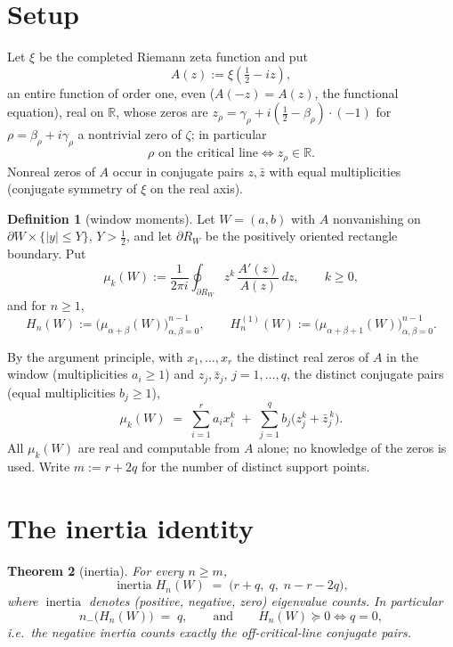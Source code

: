 \documentclass[11pt]{article}
\theoremstyle{plain}
\newtheorem{theorem}{Theorem}
\theoremstyle{definition}
\newtheorem{definition}[theorem]{Definition}
\theoremstyle{remark}
\newcommand{\R}{\mathbb{R}}
\DeclareMathOperator{\inertia}{inertia}
\begin{document}
\section{Setup}

Let $\xi$ be the completed Riemann zeta function and put
\[
  A(z) := \xi\!\left(\tfrac12 - iz\right),
\]
an entire function of order one, even ($A(-z)=A(z)$, the functional equation), real on
$\R$, whose zeros are $z_\rho = \gamma_\rho + i(\tfrac12-\beta_\rho)\cdot(-1)$ for
$\rho = \beta_\rho + i\gamma_\rho$ a nontrivial zero of $\zeta$; in particular
\[
  \rho \text{ on the critical line} \iff z_\rho \in \R .
\]
Nonreal zeros of $A$ occur in conjugate pairs $z,\bar z$ with equal multiplicities
(conjugate symmetry of $\xi$ on the real axis).

\begin{definition}[window moments]\label{def:moments}
Let $W=(a,b)$ with $A$ nonvanishing on $\partial W \times \{|y|\le Y\}$, $Y>\tfrac12$,
and let $\partial R_W$ be the positively oriented rectangle boundary. Put
\[
  \mu_k(W) := \frac{1}{2\pi i}\oint_{\partial R_W} z^k\,\frac{A'(z)}{A(z)}\,dz,
  \qquad k \ge 0,
\]
and for $n\ge 1$,
\[
  H_n(W) := \bigl(\mu_{\alpha+\beta}(W)\bigr)_{\alpha,\beta=0}^{n-1},
  \qquad
  H_n^{(1)}(W) := \bigl(\mu_{\alpha+\beta+1}(W)\bigr)_{\alpha,\beta=0}^{n-1}.
\]
\end{definition}

By the argument principle, with $x_1,\dots,x_r$ the distinct real zeros of $A$ in the
window (multiplicities $a_i\ge 1$) and $z_j,\bar z_j$, $j=1,\dots,q$, the distinct
conjugate pairs (equal multiplicities $b_j \ge 1$),
\begin{equation}\label{eq:moments}
  \mu_k(W) \;=\; \sum_{i=1}^r a_i x_i^k \;+\; \sum_{j=1}^q b_j\bigl(z_j^k + \bar z_j^{\,k}\bigr).
\end{equation}
All $\mu_k(W)$ are real and computable from $A$ alone; no knowledge of the zeros is used.
Write $m := r + 2q$ for the number of distinct support points.

\section{The inertia identity}

\begin{theorem}[inertia]\label{thm:inertia}
For every $n \ge m$,
\[
  \inertia H_n(W) \;=\; \bigl(r+q,\; q,\; n-r-2q\bigr),
\]
where $\inertia$ denotes (positive, negative, zero) eigenvalue counts. In particular
\[
  n_-\bigl(H_n(W)\bigr) \;=\; q,
  \qquad\text{and}\qquad
  H_n(W) \succeq 0 \iff q = 0,
\]
i.e.\ the negative inertia counts exactly the off-critical-line conjugate pairs.
\end{theorem}
\end{document}
